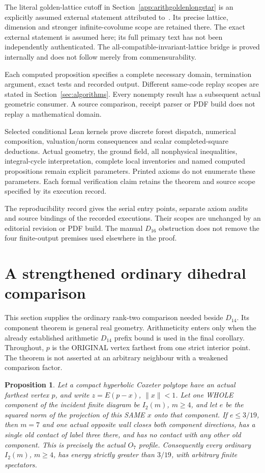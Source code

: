 \documentclass[11pt]{article}
\newtheorem{proposition}[theorem]{Proposition}
\begin{document}
The literal golden-lattice cutoff in
Section~\ref{app:arithgoldenlongstar} is an explicitly assumed external
statement attributed to~\cite{BugaenkoGolden1984}. Its precise lattice,
dimension and stronger infinite-covolume scope are retained there.
The exact external statement is assumed here; its full primary text
has not been independently authenticated. The all-compatible-invariant-lattice
bridge is proved internally and does not follow merely from commensurability.

Each computed proposition specifies a complete necessary domain,
termination argument, exact tests and recorded output. Different
same-code replay scopes are stated in Section~\ref{sec:algorithms}.
Every nonempty result has a subsequent actual geometric consumer.
A source comparison, receipt parser or PDF build does not replay a
mathematical domain.

Selected conditional Lean kernels prove discrete forest dispatch,
numerical composition, valuation/norm consequences and scalar
completed-square deductions. Actual geometry, the ground field,
all nonphysical inequalities, integral-cycle interpretation,
complete local inventories and named computed propositions remain
explicit parameters. Printed axioms do not enumerate these parameters.
Each formal verification claim retains the theorem and source scope
specified by its execution record.

The reproducibility record gives the serial entry points, separate
axiom audits and source bindings of the recorded executions. Their
scopes are unchanged by an editorial revision or PDF build. The manual
$D_{16}$ obstruction does not remove the four finite-output premises
used elsewhere in the proof.

\appendix
\section{A strengthened ordinary dihedral comparison}
\label{app:arithdihedral}

This section supplies the ordinary rank-two comparison needed beside
\(D_{14}\).  Its component theorem is general real geometry.
Arithmeticity enters only when the already established arithmetic
\(D_{14}\) prefix bound is used in the final corollary.
Throughout, \(p\) is the ORIGINAL vertex farthest from one strict
interior point.  The theorem is not asserted at an arbitrary
neighbour with a weakened comparison factor.

\begin{proposition}\label{prop:ordinarydihedralthreenineteenths}
Let a compact hyperbolic Coxeter polytope have an actual farthest
vertex \(p\), and write \(z=E(p-x)\), \(\|x\|<1\).
Let one WHOLE component of the incident finite diagram be
\(I_2(m)\), \(m\ge4\), and let \(e\) be the squared norm of the
projection of this SAME \(x\) onto that component.
If \(e\le3/19\), then \(m=7\) and one actual opposite wall
closes both component directions, has a single old contact of
label three there, and has no contact with any other old component.
This is precisely the actual \(O_7\) profile.
Consequently every ordinary \(I_2(m)\), \(m\ge4\), has energy
strictly greater than \(3/19\), with arbitrary finite spectators.
\end{proposition}
\end{document}
